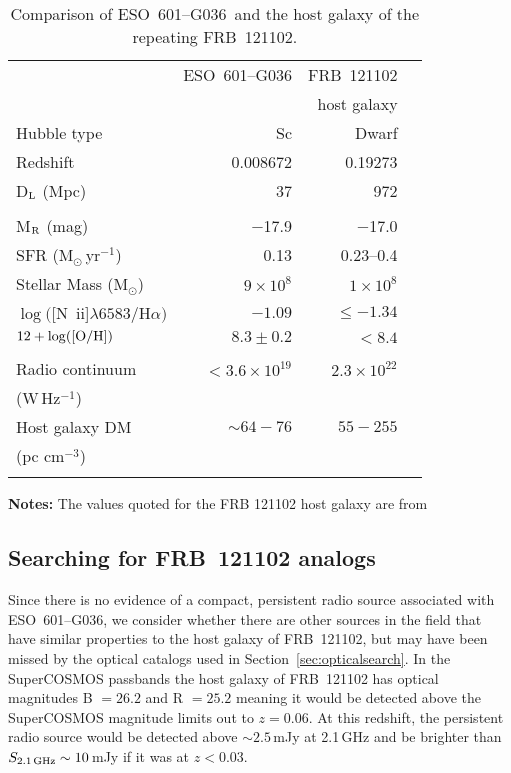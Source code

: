 \documentclass[twocolumn]{aastex63}
\newcommand{\galname}{ESO~601--G036}
\newcommand{\ha}{H$\alpha$}
\newcommand{\nii}{[N~{\sc ii}]}
\begin{document}
\begin{table}
\caption{Comparison of \galname\ and the host galaxy of the repeating FRB~121102. \label{tab_compare}}
\begin{tabular}{lrrr}
 \hline
 & \galname & FRB~121102   \\
 &          & host galaxy     \\
 \hline
Hubble type & Sc & Dwarf & \\
Redshift & 0.008672 & 0.19273  \\
D$_{\rm L}$ (Mpc) & 37 & 972   \\
 && \\
 M$_{\rm R}$ (mag) & $-$17.9 & $-$17.0  \\
SFR (M$_\odot$\,yr$^{-1}$) &  0.13   & 0.23--0.4  \\
Stellar Mass (M$_\odot$) & $9\times10^{8}$ & $1\times10^{8}$ \\
$\log ($\nii$\lambda6583$/\ha$)$ &$ -1.09$ & $\leq -1.34$\\
$12 + \log({\rm [O/H]})$ & $ 8.3 \pm 0.2$ & $< 8.4$\\
&&& \\
Radio continuum & $<3.6\times10^{19}$ & $2.3\times10^{22}$ \\
(W\,Hz$^{-1}$) &   \\
Host galaxy DM & $\sim64-76$ & $55-255$\\
(pc cm$^{-3}$)& & \\
\hline
&&& \\
\end{tabular}
     \raggedright {\bf Notes:} The values quoted for the FRB 121102 host galaxy are from \cite{Tendulkar2017,bassa2017}\\
\end{table}

\subsection{Searching for FRB~121102 analogs} \label{sec:radiosearch}

Since there is no evidence of a compact, persistent radio source associated with \galname, we consider whether there are other sources in the field that have similar properties to the host galaxy of FRB~121102, but may have been missed by the optical catalogs used in Section~\ref{sec:opticalsearch}. In the SuperCOSMOS passbands the host galaxy of FRB~121102 has optical magnitudes B $=26.2$ and R $=25.2$ meaning it would be detected above the SuperCOSMOS magnitude limits out to $z=0.06$. At this redshift, the persistent radio source  would be detected above $\sim 2.5$\,mJy at 2.1\,GHz and be brighter than $S_{\rm 2.1\,GHz}\sim 10$\,mJy if it was at $z<0.03$. 
\end{document}
